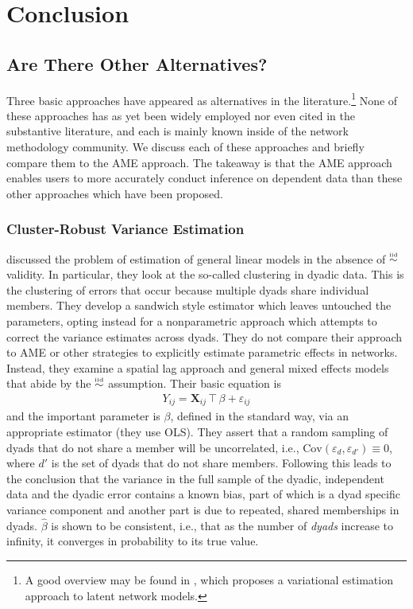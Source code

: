 \section{\textbf{Conclusion}}

\subsection*{Are There Other Alternatives?}

Three basic approaches have appeared as alternatives in the literature.\footnote{A good overview may be found in \cite{stewart:2014}, which proposes a variational estimation approach to latent network models.}
None of these approaches has as yet been widely employed nor even cited in the substantive literature, and each is mainly known inside of the network methodology community.  We discuss each of these approaches and briefly compare them to the AME approach. The takeaway is that the AME approach enables users to more accurately conduct inference on dependent data than these other approaches which have been proposed.


\subsubsection*{Cluster-Robust Variance Estimation}

\cite{aronow:etal:2015} discussed the problem of estimation of general linear models in the absence of $\simiid$ validity. In particular, they look at the so-called clustering in dyadic data. This is the clustering of errors that occur because multiple dyads share individual members. They develop a sandwich style estimator which leaves untouched the parameters, opting instead for a nonparametric approach which attempts to correct the variance estimates across dyads.  They do not compare their approach to AME or other strategies to explicitly estimate parametric effects in networks. Instead, they examine a spatial lag approach and general mixed effects models that abide by the $\simiid$ assumption.  Their basic equation is 
\begin{eqnarray*}
Y_{ij} = \mathbf{X}_{ij}\intercal \beta + \varepsilon_{ij}
\end{eqnarray*}
and the important parameter is $\beta$, defined in the standard way, via an appropriate estimator (they use OLS).  They assert that a random sampling of dyads that do not share a member will be uncorrelated, i.e., $\text{Cov}(\varepsilon_d,\varepsilon_{d'}) \equiv 0$, where $d'$ is the set of dyads that do not share members. Following this leads to the conclusion that the variance in the full sample of the dyadic, independent data and the dyadic error contains a known bias, part of which is a dyad specific variance component and another part is due to repeated, shared memberships in dyads. $\hat{\beta}$ is shown to be consistent, i.e., that as the number of \emph{dyads} increase to infinity, it converges in probability to its true value. 

